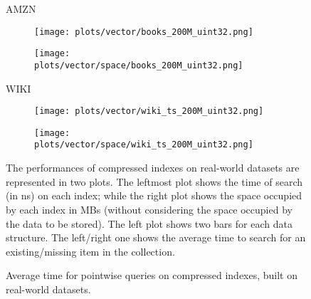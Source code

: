 \documentclass{article}
\begin{document}
\begin{figure}[!htbp]
{\begin{minipage}[t][0.98\textheight][t]{\textwidth}
    \begin{minipage}{0.03\linewidth}
    \begin{sideways}\small AMZN\end{sideways}
    \end{minipage}
    \begin{minipage}{0.32\linewidth}
        \begin{figure}[H]
        \texttt{[image: plots/vector/books\_200M\_uint32.png]}
        \end{figure}
    \end{minipage}
    \begin{minipage}{0.32\linewidth}
        \begin{figure}[H]
            \texttt{[image: plots/vector/space/books\_200M\_uint32.png]}
        \end{figure}
    \end{minipage}
    \vspace*{-15px}

    \begin{minipage}{0.03\linewidth}
    \begin{sideways}\small WIKI\end{sideways}
    \end{minipage}
    \begin{minipage}{0.32\linewidth}
        \begin{figure}[H]
        \texttt{[image: plots/vector/wiki\_ts\_200M\_uint32.png]}
        \end{figure}
    \end{minipage}
    \begin{minipage}{0.32\linewidth}
        \begin{figure}[H]
            \texttt{[image: plots/vector/space/wiki\_ts\_200M\_uint32.png]}
        \end{figure}
    \end{minipage}

    \vfill
    \centering
    \begin{minipage}{\linewidth}
The performances of compressed indexes on real-world datasets are represented in two plots. The leftmost plot shows the time of search (in ns) on each index; while the right plot shows the space occupied by each index in MBs (without considering the space occupied by the data to be stored). The left plot shows two bars for each data structure. The left/right one shows the average time to search for an existing/missing item in the collection.
    \end{minipage}
    \vspace{10px}
\end{minipage}
}
\caption{Average time for pointwise queries on compressed indexes, built on real-world datasets.}
\end{figure}
\end{document}

